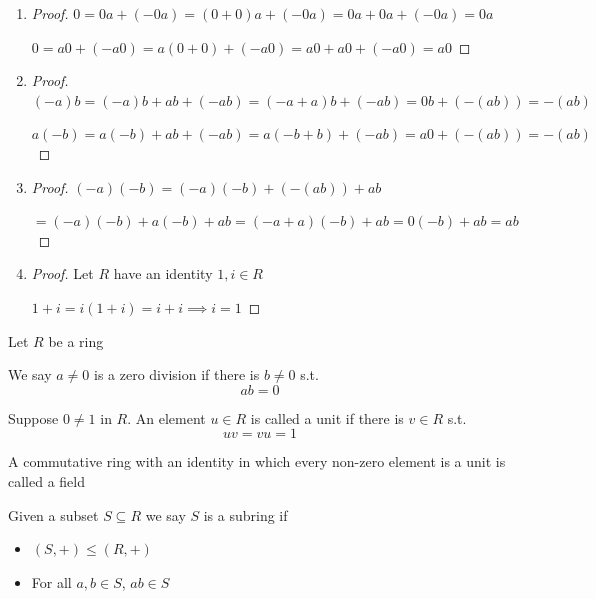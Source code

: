 \begin{enumerate}
    \item \begin{proof}
        $0=0a+(-0a)=(0+0)a+(-0a)=0a+0a+(-0a)=0a$

        $0=a0+(-a0)=a(0+0)+(-a0)=a0+a0+(-a0)=a0$
    \end{proof}
    \item \begin{proof}
        $(-a)b=(-a)b+ab+(-ab)=(-a+a)b+(-ab)=0b+(-(ab))=-(ab)$

        $a(-b)=a(-b)+ab+(-ab)=a(-b+b)+(-ab)=a0+(-(ab))=-(ab)$
    \end{proof}
    \item \begin{proof}
        $(-a)(-b)=(-a)(-b)+(-(ab))+ab$
        
        $=(-a)(-b)+a(-b)+ab=(-a+a)(-b)+ab=0(-b)+ab=ab$
    \end{proof}
    \item \begin{proof}
        Let $R$ have an identity $1,i\in R$

        $1+i=i(1+i)=i+i \implies i=1$
    \end{proof}
\end{enumerate}

\newpage
Let $R$ be a ring
\begin{definition}
    We say $a \neq 0$ is a zero division if there
    is $b \neq 0$ s.t. \[ab=0\]
\end{definition}

\begin{definition}
    Suppose $0 \neq 1$ in $R$. An element $u\in R$
    is called a unit if there is $v\in R$ s.t. \[uv=vu=1\]
\end{definition}

\begin{definition}
    A commutative ring with an identity in which every 
    non-zero element is a unit is called a field
\end{definition}

\begin{definition}
    Given a subset $S \subseteq R$ we say $S$
    is a subring if
    \begin{itemize}
        \item $(S,+)\leq(R,+)$
        \item For all $a,b\in S$, $ab \in S$
    \end{itemize}
\end{definition}

